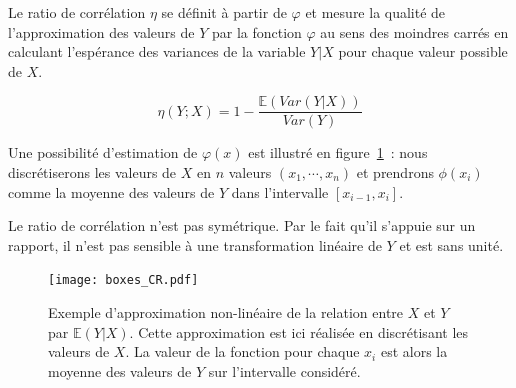\documentclass[../main]{subfiles}
\begin{document}
Le ratio de corrélation $\eta$ se définit à partir de $\varphi$ et mesure la qualité de l'approximation des valeurs de $Y$ par la fonction $\varphi$ au sens des moindres carrés en calculant l'espérance des variances de la variable $Y|X$ pour chaque valeur possible de $X$. 

\begin{equation}\label{eq:cr}
   \eta(Y;X) = 1 - \frac{\mathbb{E}(Var(Y|X))}{Var(Y)}
\end{equation}

Une possibilité d'estimation de $\varphi(x)$ est illustré en figure~\ref{fig:cr_box}~: nous discrétiserons les valeurs de $X$ en $n$ valeurs $(x_1, \cdots, x_n)$ et prendrons $\phi(x_i)$ comme la moyenne des valeurs de $Y$ dans l'intervalle $[x_{i-1}, x_i]$.




Le ratio de corrélation n'est pas symétrique. Par le fait qu'il s'appuie sur un rapport, il n'est pas sensible à une transformation linéaire de $Y$ et est sans unité.

\begin{figure}
    \centering
    \texttt{[image: boxes\_CR.pdf]}
    \caption{Exemple d'approximation non-linéaire de la relation entre $X$ et $Y$ par $\mathbb{E}(Y|X)$. Cette approximation est ici réalisée en discrétisant les valeurs de $X$. La valeur de la fonction pour chaque $x_i$ est alors la moyenne des valeurs de $Y$ sur l'intervalle considéré.\label{fig:cr_box}}
\end{figure}
\end{document}
